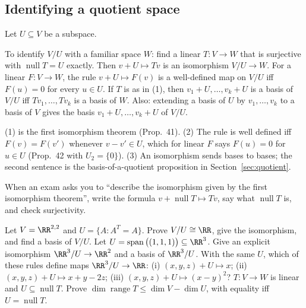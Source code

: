 \documentclass[10pt]{scrartcl}
\DeclareMathOperator{\nul}{null}
\DeclareMathOperator{\range}{range}
\DeclareMathOperator{\spn}{span}
\begin{document}
\subsection{Identifying a quotient space}
\begin{theorem*}[T4]
  Let $U\subseteq V$ be a subspace.
  \begin{enumerate}
    \ii To identify $V/U$ with a familiar space $W$: find a linear $T\colon V\to W$ that is surjective with $\nul T=U$ exactly. Then $v+U\mapsto Tv$ is an isomorphism $V/U\to W$.
    \ii For a linear $F\colon V\to W$, the rule $v+U\mapsto F(v)$ is a well-defined map on $V/U$ iff $F(u)=0$ for every $u\in U$.
    \ii If $T$ is as in (1), then $v_1+U,\dots,v_k+U$ is a basis of $V/U$ iff $Tv_1,\dots,Tv_k$ is a basis of $W$. Also: extending a basis of $U$ by $v_1,\dots,v_k$ to a basis of $V$ gives the basis $v_1+U,\dots,v_k+U$ of $V/U$.
  \end{enumerate}
\end{theorem*}
\why (1) is the first isomorphism theorem (Prop.~41). (2) The rule is well defined iff $F(v)=F(v')$ whenever $v-v'\in U$, which for linear $F$ says $F(u)=0$ for $u\in U$ (Prop.~42 with $U_2=\{0\}$). (3) An isomorphism sends bases to bases; the second sentence is the basis-of-a-quotient proposition in Section~\ref{sec:quotient}.

When an exam asks you to ``describe the isomorphism given by the first isomorphism theorem'', write the formula $v+\nul T\mapsto Tv$, say what $\nul T$ is, and check surjectivity.
\probs
\begin{enumerate}[(a)]
  \ii Let $V=\RR^{2,2}$ and $U=\{A:A^T=A\}$. Prove $V/U\cong\RR$, give the isomorphism, and find a basis of $V/U$.
  \ii Let $U=\spn\big((1,1,1)\big)\subseteq\RR^3$. Give an explicit isomorphism $\RR^3/U\to\RR^2$ and a basis of $\RR^3/U$.
  \ii With the same $U$, which of these rules define maps $\RR^3/U\to\RR$: (i) $(x,y,z)+U\mapsto x$; (ii) $(x,y,z)+U\mapsto x+y-2z$; (iii) $(x,y,z)+U\mapsto(x-y)^2$?
  \ii $T\colon V\to W$ is linear and $U\subseteq\nul T$. Prove $\dim\range T\le\dim V-\dim U$, with equality iff $U=\nul T$.
\end{enumerate}
\end{document}
